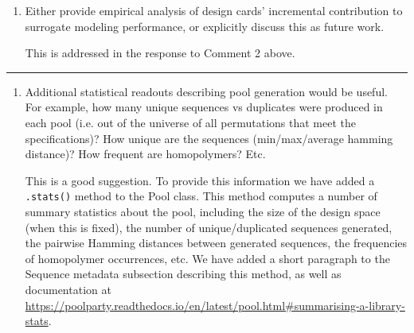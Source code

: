 \documentclass[11pt]{article}
\newenvironment{response}{\par\color{responseblue}}{\par}
\newcommand{\reviewersection}[1]{%
  \bigskip\par\noindent{\large\bfseries #1}\par\medskip\hrule\medskip}
\begin{document}
\begin{enumerate}
\item Either provide empirical analysis of design cards' incremental
contribution to surrogate modeling performance, or explicitly discuss this as
future work.

\begin{response}
This is addressed in the response to Comment 2 above. 
\end{response}
\end{enumerate}

\reviewersection{Reviewer 2}

\begin{enumerate}
\item Additional statistical readouts describing pool generation would be
useful. For example, how many unique sequences vs duplicates were produced in
each pool (i.e. out of the universe of all permutations that meet the
specifications)? How unique are the sequences (min/max/average hamming distance)?
How frequent are homopolymers? Etc.

\begin{response}
This is a good suggestion. To provide this information we have added a \texttt{.stats()} method to the Pool class. This method computes a number of summary statistics about the pool, including the size of the design space (when this is fixed), the number of unique/duplicated sequences generated, the pairwise Hamming distances between generated sequences, the frequencies of homopolymer occurrences, etc. We have added a short paragraph to the Sequence metadata subsection describing this method, as well as documentation at \url{https://poolparty.readthedocs.io/en/latest/pool.html#summarising-a-library-stats}. 
\end{response}



\end{enumerate}
\end{document}
